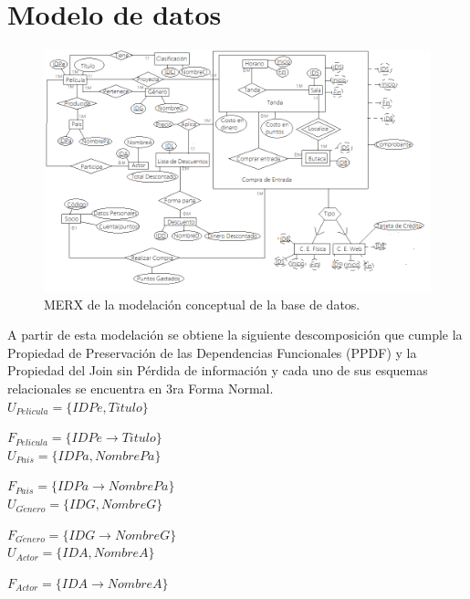\chapter{Modelo de datos}\label{ch:model}

\begin{figure}[h]
    \begin{center}
        \includegraphics[width=16.0cm]{./chapters/img/is.png}
    \end{center}

    \caption{MERX de la modelación conceptual de la base de datos.}
\end{figure}

A partir de esta modelación se obtiene la siguiente descomposición que cumple la Propiedad de Preservación de las Dependencias Funcionales (PPDF) y la Propiedad del Join sin Pérdida de información  y cada uno de sus esquemas relacionales se encuentra en 3ra Forma Normal.\\
	
	$U_{Pelicula}=\{IDPe, Titulo\}$
	
	$F_{Pelicula}=\{IDPe\rightarrow Titulo\}$\\
	
	$U_{Pais}=\{IDPa, NombrePa\}$
	
	$F_{Pais}=\{IDPa\rightarrow NombrePa\}$\\
	
	$U_{G\acute{e}nero}=\{IDG, NombreG\}$
	
	$F_{G\acute{e}nero}=\{IDG\rightarrow NombreG\}$\\
	
	$U_{Actor}=\{IDA, NombreA\}$
		
	$F_{Actor}=\{IDA\rightarrow NombreA\}$\\
	
